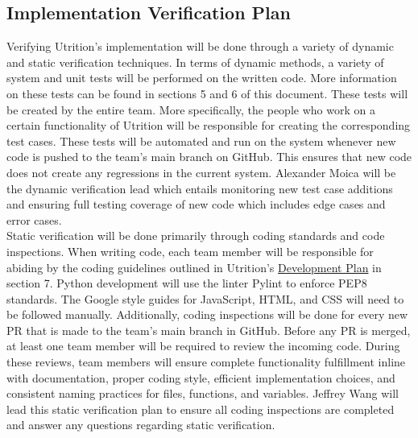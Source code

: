 \documentclass[12pt, titlepage]{article}
\begin{document}
	\subsection{Implementation Verification Plan}
	
	
	
	Verifying Utrition's implementation will be done through a variety of dynamic and static verification techniques. In terms of dynamic methods, a variety of system and unit tests will be performed on the written code. More information on these tests can be found in sections 5 and 6 of this document. These tests will be created by the entire team. More specifically, the people who work on a certain functionality of Utrition will be responsible for creating the corresponding test cases. These tests will be automated and run on the system whenever new code is pushed to the team's main branch on GitHub. This ensures that new code does not create any regressions in the current system. Alexander Moica will be the dynamic verification lead which entails monitoring new test case additions and ensuring full testing coverage of new code which includes edge cases and error cases.\\
	
	Static verification will be done primarily through coding standards and code inspections. When writing code, each team member will be responsible for abiding by the coding guidelines outlined in Utrition's \href{https://github.com/jeff-rey-wang/utrition/blob/dff32f8ddc662d07db9bd74e0b3705aa657dae6e/docs/DevelopmentPlan/DevelopmentPlan.pdf}{Development Plan} in section 7. Python development will use the linter Pylint to enforce PEP8 standards. The Google style guides for JavaScript, HTML, and CSS will need to be followed manually. Additionally, coding inspections will be done for every new PR that is made to the team's main branch in GitHub. Before any PR is merged, at least one team member will be required to review the incoming code. During these reviews, team members will ensure complete functionality fulfillment inline with documentation, proper coding style, efficient implementation choices, and consistent naming practices for files, functions, and variables. Jeffrey Wang will lead this static verification plan to ensure all coding inspections are completed and answer any questions regarding static verification.
	
\end{document}
